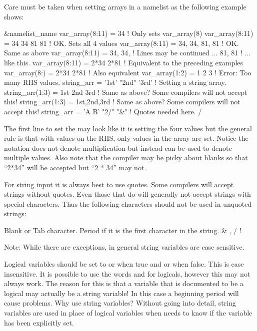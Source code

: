 Care must be taken when setting arrays in a namelist as the following example
shows:
\begin{example}
  &namelist_name
    var_array(8:11) = 34             ! Only sets var_array(8)
    var_array(8:11) = 34 34 81 81    ! OK. Sets all 4 values
    var_array(8:11) = 34, 34, 81, 81 ! OK. Same as above
    var_array(8:11) = 34, 34,        ! Lines may be continued ...
                      81, 81         !   ... like this.
    var_array(8:11) = 2*34 2*81      ! Equivalent to the preceding examples
    var_array(8:)   = 2*34 2*81      ! Also equivalent
    var_array(1:2) = 1 2 3           ! Error: Too many RHS values.
    string_arr = '1st' "2nd" '3rd'   ! Setting a string array.
    string_arr(1:3) = 1st 2nd 3rd    ! Same as above? Some compilers will not accept this!
    string_arr(1:3) = 1st,2nd,3rd    ! Same as above? Some compilers will not accept this!
    string_arr = 'A B' "2/" "&"      ! Quotes needed here.
  /
\end{example}
The first line to set the  may look like it is setting 
the four values  but the general rule is that with 
values on the RHS, only  values in the array are set. Notice the notation
 does not denote multiplication but instead can be used to denote
multiple values. Also note that the compiler may be picky about blanks so 
that ``2*34'' will be accepted but ``2 * 34'' may not.

For string input it is always best to use quotes. Some compilers will
accept strings without quotes. Even those that do will generally not
accept strings with special characters.  Thus the following characters
should not be used in unquoted strings:
\begin{example}
  Blank or Tab character.
  Period if it is the first character in the string.
  &   ,   /    !   %
\end{example}
Note: While there are exceptions, in general \tao string variables are
case sensitive.

Logical variables should be set to  or  when true and
 or  when false. This is case insensitive. It is
possible to use the words  and  for logicals,
however this may not always work. The reason for this is that a
variable that is documented to be a logical may actually be a string
variable! In this case a beginning period will cause problems. Why use
string variables? Without going into detail, string variables are used
in place of logical variables when \tao needs to know if the variable
has been explicitly set.

